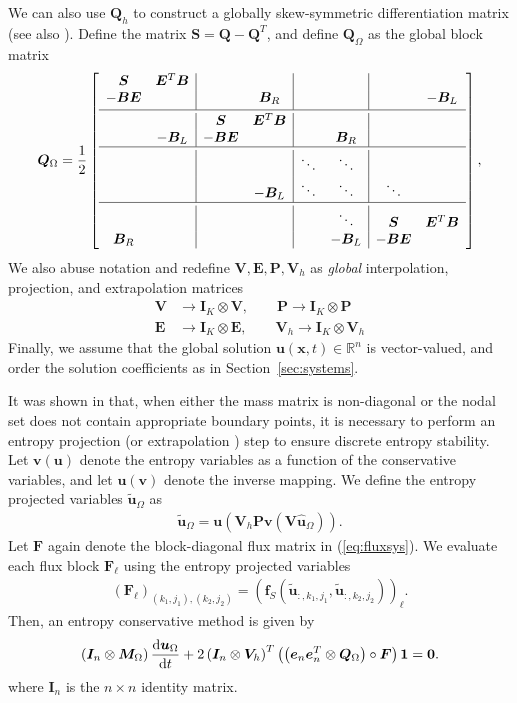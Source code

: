 \documentclass{article}
\renewcommand{\hat}{\widehat}
\renewcommand{\tilde}{\widetilde}
\newcommand{\td}[2]{\frac{{\rm d}#1}{{\rm d}{ {#2}}}}
\newcommand{\LRp}[1]{\left( #1 \right)}
\newcommand{\LRs}[1]{\left[ #1 \right]}
\newcommand{\eq}[1]{\begin{align*}#1\end{align*}}
\newcommand{\eqlab}[1]{\begin{align}#1\end{align}}
\begin{document}
We can also use $\bm{Q}_h$ to construct a globally skew-symmetric differentiation matrix (see also \cite{chan2018efficient}).  Define the matrix $\bm{S} = \bm{Q}-\bm{Q}^T$, and define $\bm{Q}_{\Omega}$ as the global block matrix
\[
\bm{Q}_{\Omega} = \frac{1}{2}\LRs{\begin{array}{cc|cc|cc|cc}
\bm{S} &  \bm{E}^T\bm{B} & &&& && \\
 - \bm{B}\bm{E} &  & & \bm{B}_R && && -\bm{B}_L\\ [.2em]
 \hline\\[-1.0em]
&& \bm{S} &  \bm{E}^T\bm{B}&&&& \\
& -\bm{B}_L &  - \bm{B}\bm{E} &&& \bm{B}_R&&\\
 \hline\\[-1.0em]
&&&& \ddots & \ddots&  \\
&&&   -\bm{B}_L & \ddots&\ddots&   \ddots&\\
 \hline\\[-1.0em]
&&&&&\ddots& \bm{S} &  \bm{E}^T\bm{B} \\
\bm{B}_R &&& &&-\bm{B}_L &  - \bm{B}\bm{E} &\\
\end{array}},
\]
We also abuse notation and redefine $\bm{V},\bm{E},\bm{P},\bm{V}_h$ as \emph{global} interpolation, projection, and extrapolation matrices
\eq{
\bm{V} &\longrightarrow \bm{I}_K \otimes \bm{V}, \qquad \bm{P} \longrightarrow \bm{I}_K \otimes \bm{P} \\ 
\bm{E} &\longrightarrow \bm{I}_K \otimes \bm{E}, \qquad \bm{V}_h \longrightarrow \bm{I}_K \otimes \bm{V}_h
}
Finally, we assume that the global solution $\bm{u}(\bm{x},t) \in \mathbb{R}^n$ is vector-valued, and order the solution coefficients as in Section~\ref{sec:systems}.  

It was shown in \cite{parsani2016entropy, chan2017discretely} that, when either the mass matrix is non-diagonal or the nodal set does not contain appropriate boundary points, it is necessary to perform an entropy projection (or extrapolation \cite{chenreview}) step to ensure discrete entropy stability.  Let $\bm{v}(\bm{u})$ denote the entropy variables as a function of the conservative variables, and let $\bm{u}(\bm{v})$ denote the inverse mapping.  We define the entropy projected variables $\tilde{\bm{u}}_{\Omega}$ as
\eqlab{
\tilde{\bm{u}}_{\Omega} = \bm{u}\LRp{\bm{V}_h\bm{P}\bm{v}\LRp{\bm{V}\hat{\bm{u}}_{\Omega}}}.
\label{eq:entropyprojection}
}
Let $\bm{F}$ again denote the block-diagonal flux matrix in (\ref{eq:fluxsys}).  We evaluate each flux block $\bm{F}_{\ell}$  using the entropy projected variables
\eqlab{
\LRp{\bm{F}_\ell}_{(k_1, j_1),(k_2,j_2)} = \LRp{\bm{f}_{S}\LRp{\tilde{\bm{u}}_{:, k_1,j_1},\tilde{\bm{u}}_{:, k_2,j_2}}}_{\ell}.
\label{eq:fluxell}
}
Then, an entropy conservative method is given by 
\[
\LRp{\bm{I}_n\otimes \bm{M}_{\Omega}}\td{\bm{u}_{\Omega}}{t} + 2\LRp{\bm{I}_n\otimes \bm{V}_h}^T\LRp{ \LRp{\bm{e}_n\bm{e}_n^T\otimes \bm{Q}_{\Omega} } \circ \bm{F}}\bm{1} = \bm{0}.
\]
where $\bm{I}_n$ is the $n\times n$ identity matrix.
\end{document}
